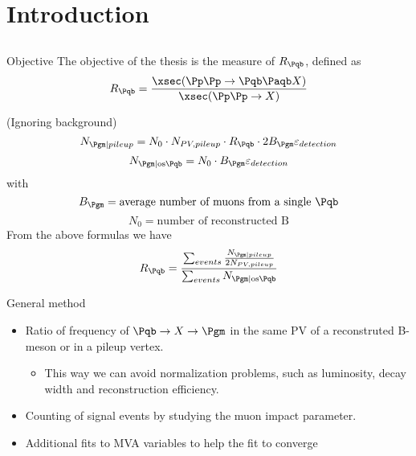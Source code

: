 \section{Introduction}
\subsection{}

\begin{frame}
	\begin{block}{Objective}
		The objective of the thesis is the measure of $R_{\Pqb}$, defined as 
		\[R_{\Pqb}=\frac{\xsec(\Pp\Pp\to\Pqb\Paqb X)}{\xsec(\Pp\Pp\to X)}\]
	\end{block}
	(Ignoring background)
	\[N_{\Pgm|pileup}=N_0\cdot N_{PV,pileup}\cdot R_{\Pqb}\cdot 2 B_{\Pgm}\varepsilon_{detection}\]
	\[N_{\Pgm|\text{os\Pqb}}=N_0\cdot B_{\Pgm}\varepsilon_{detection}\]
	with
	\[B_{\Pgm}=\text{average number of muons from a single \Pqb}\]
	\[N_0=\text{number of reconstructed B}\]
	From the above formulas we have
	\[R_{\Pqb}=\frac{\sum_{events}\frac{N_{\Pgm|pileup}}{2N_{PV,pileup}}}{\sum_{events}N_{\Pgm|\text{os\Pqb}}}\]
\end{frame}

\begin{frame}
	\begin{block}{General method}
		\begin{itemize}
			\item Ratio of frequency of $\Pqb \to X\to\Pgm$ in the same PV of a reconstruted B-meson or in a pileup vertex.
				\begin{itemize}
					\item This way we can avoid normalization problems, such as luminosity, decay width and reconstruction efficiency.
				\end{itemize}
			\item Counting of signal events by studying the muon impact parameter.
			\item Additional fits to MVA variables to help the fit to converge
		\end{itemize}
	\end{block}
\end{frame}


